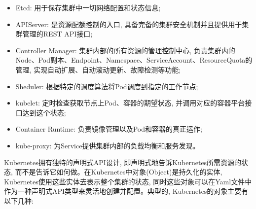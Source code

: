 \begin{itemize}[itemindent=2em]
    \item Etcd: 用于保存集群中一切网络配置和状态信息;

    \item APIServer: 是资源配额控制的入口, 具备完备的集群安全机制并且提供用于集群管理的REST API接口;

    \item Controller Manager: 集群内部的所有资源的管理控制中心, 负责集群内的Node、Pod副本、Endpoint、Namespace、ServiceAccount、ResourceQuota的管理, 实现自动扩展、自动滚动更新、故障检测等功能;

    \item Sheduler: 根据特定的调度算法将Pod调度到指定的工作节点;

    \item kubelet: 定时检查获取节点上Pod、容器的期望状态, 并调用对应的容器平台接口达到这个状态;

    \item Container Runtime: 负责镜像管理以及Pod和容器的真正运作\cite{wangjunxiang2018};

    \item kube-proxy: 为Service提供集群内部的负载均衡和服务发现。
\end{itemize}

Kubernetes拥有独特的声明式API设计, 即声明式地告诉Kubernetes所需资源的状态, 而不是告诉它如何做。在Kubernetes中对象(Object)是持久化的实体, Kubernetes使用这些实体去表示整个集群的状态, 同时这些对象可以在Yaml\cite{ben2009yaml}文件中作为一种声明式API类型来灵活地创建并配置。典型的, Kubernetes的对象主要有以下几种: 

